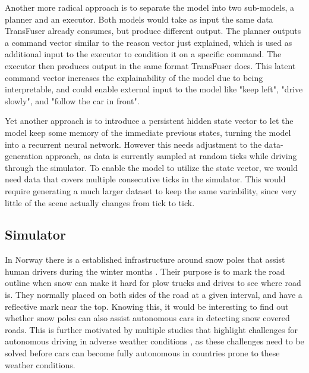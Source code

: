 Another more radical approach is to separate the model into two sub-models,
a planner and an executor.
Both models would take as input the same data TransFuser already consumes,
but produce different output.
The planner outputs a command vector similar to the reason vector just explained,
which is used as additional input to the executor to condition it on a specific command.
The executor then produces output in the same format TransFuser does.
This latent command vector increases the explainability of the model
due to being interpretable,
and could enable external input to the model like
"keep left", "drive slowly", and "follow the car in front".

Yet another approach is to introduce a persistent hidden state vector
to let the model keep some memory of the immediate previous states,
turning the model into a recurrent neural network.
However this needs adjustment to the data-generation approach,
as data is currently sampled at random ticks while driving through the simulator.
To enable the model to utilize the state vector,
we would need data that covers multiple consecutive ticks in the simulator.
This would require generating a much larger dataset to keep the same variability,
since very little of the scene actually changes from tick to tick.


\subsection{Simulator}




 In Norway there is a established infrastructure around snow poles that assist human drivers during the winter months \cite{statens-vegvesen-handbok-111}. Their purpose is to mark the road outline when snow can make it hard for plow trucks and drives to see where road is. They normally placed on both sides of the road at a given interval, and have a reflective mark near the top. Knowing this, it would be interesting to find out whether snow poles can also assist autonomous cars in detecting snow covered roads. This is further motivated by multiple studies that highlight challenges for autonomous driving in adverse weather conditions \cite{impact-of-adverse-weather-conditions, Sensor-Fusion-Based-Semantic-Segmentation}, as these challenges need to be solved before cars can become fully autonomous in countries prone to these weather conditions.

